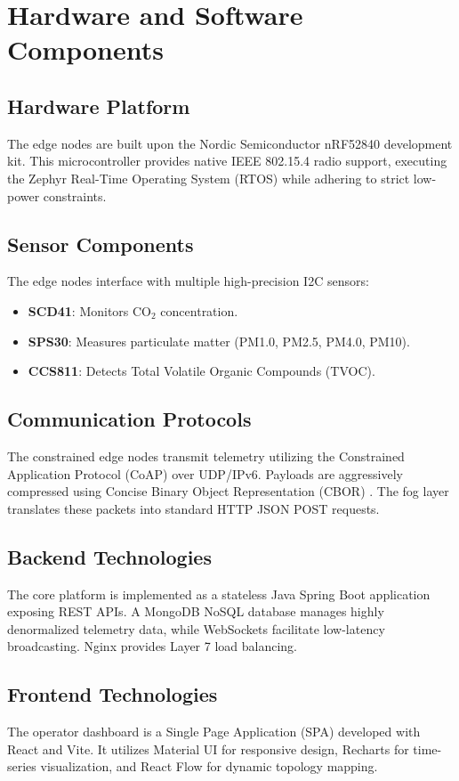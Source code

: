\documentclass[conference]{IEEEtran}
\begin{document}
\section{Hardware and Software Components}
\subsection{Hardware Platform}
The edge nodes are built upon the Nordic Semiconductor nRF52840 development kit. This microcontroller provides native IEEE 802.15.4 radio support, executing the Zephyr Real-Time Operating System (RTOS) \cite{b6} while adhering to strict low-power constraints.

\subsection{Sensor Components}
The edge nodes interface with multiple high-precision I2C sensors:
\begin{itemize}
\setlength{\itemsep}{0pt}
\item \textbf{SCD41}: Monitors CO$_2$ concentration.
\item \textbf{SPS30}: Measures particulate matter (PM1.0, PM2.5, PM4.0, PM10).
\item \textbf{CCS811}: Detects Total Volatile Organic Compounds (TVOC).
\end{itemize}

\subsection{Communication Protocols}
The constrained edge nodes transmit telemetry utilizing the Constrained Application Protocol (CoAP) \cite{b8} over UDP/IPv6. Payloads are aggressively compressed using Concise Binary Object Representation (CBOR) \cite{b9}. The fog layer translates these packets into standard HTTP JSON POST requests.

\subsection{Backend Technologies}
The core platform is implemented as a stateless Java Spring Boot application exposing REST APIs. A MongoDB NoSQL database manages highly denormalized telemetry data, while WebSockets facilitate low-latency broadcasting. Nginx provides Layer 7 load balancing.

\subsection{Frontend Technologies}
The operator dashboard is a Single Page Application (SPA) developed with React and Vite. It utilizes Material UI for responsive design, Recharts for time-series visualization, and React Flow for dynamic topology mapping.
\end{document}

